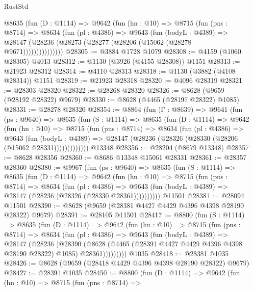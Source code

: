 \begin{lexlean}{RustStd}
\begin{coremodule}
          @8635
            (fun (D : @1114) =>
            @9642
              (fun (hn : @10) =>
              @8715
                (fun (pns : @8714) =>
                @8634
                  (fun (pl : @4386) =>
                  @9643
                    (fun (bodyL : @4389) =>
                    @28147 (@28236 (@28273 (@28277 (@28206 (@15062 (@28278 @9671)))))))))))))))
@28305 := @3884 @1728 @1079
@28308 := @4159 (@1060 @28305) @4013
@28312 := @1130 (@3926 (@4155 @28308)) @1151
@28313 := @21923 @28312
@28314 := @4110 @28313
@28318 := @1130 (@3882 (@4108 @28314)) @1151
@28319 := @21923 @28318
@28320 := @4096 @28319
@28321 := @28303 @28320
@28322 := @28268 @28320
@28326 := @8628 (@9659 (@28192 @28322) @9679)
@28330 := @8628 (@4465 (@28197 @28322) @1085)
@28331 := @28278 @28320
@28354 := @8864
    (fun (Γ : @8639) =>
    @9641
      (fun (ps : @9640) =>
      @8635
        (fun (S : @1114) =>
        @8635
          (fun (D : @1114) =>
          @9642
            (fun (hn : @10) =>
            @8715
              (fun (pns : @8714) =>
              @8634
                (fun (pl : @4386) =>
                @9643
                  (fun (bodyL : @4389) =>
                  @28147 (@28236 (@28326 (@28330 (@28206 (@15062 @28331)))))))))))))
    @13348
@28356 := @28204 (@8679 @13348)
@28357 := @8628 @28356
@28360 := @8686 @13348 @15061 @28331
@28361 := @28357 @28360
@28380 := @9967
    (fun (ps : @9640) =>
    @8635
      (fun (S : @1114) =>
      @8635
        (fun (D : @1114) =>
        @9642
          (fun (hn : @10) =>
          @8715
            (fun (pns : @8714) =>
            @8634
              (fun (pl : @4386) =>
              @9643 (fun (bodyL : @4389) => @28147 (@28236 (@28326 (@28330 @28361))))))))))
    @11501
@28381 := @28094 @11501
@28390 := @8628 (@9659 (@28381 @4427 @4429 @4396 @4398 @28190 @28322) @9679)
@28391 := @28105 @11501
@28417 := @8800
    (fun (S : @1114) =>
    @8635
      (fun (D : @1114) =>
      @9642
        (fun (hn : @10) =>
        @8715
          (fun (pns : @8714) =>
          @8634
            (fun (pl : @4386) =>
            @9643
              (fun (bodyL : @4389) =>
              @28147
                (@28236
                  (@28390
                    (@8628
                      (@4465 (@28391 @4427 @4429 @4396 @4398 @28190 @28322) @1085)
                      @28361)))))))))
    @1035
@28418 := @28381 @1035
@28426 := @8628 (@9659 (@28418 @4429 @4396 @4398 @28190 @28322) @9679)
@28427 := @28391 @1035
@28450 := @8800
    (fun (D : @1114) =>
    @9642
      (fun (hn : @10) =>
      @8715
        (fun (pns : @8714) =>

\end{coremodule}
\end{lexlean}
